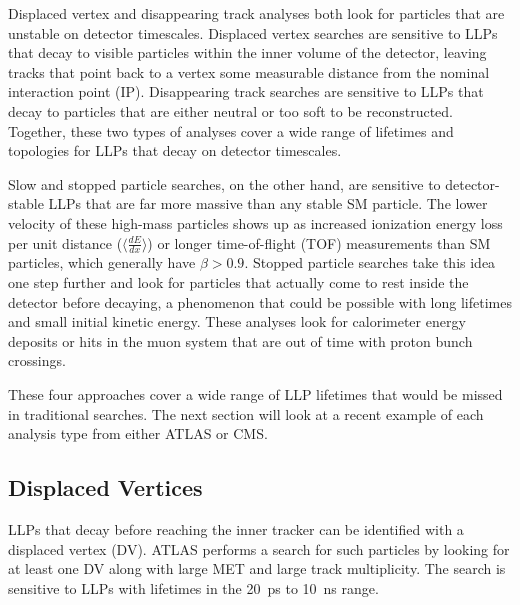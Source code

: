 \documentclass[12pt]{article}
\begin{document}
    Displaced vertex and disappearing track analyses both look for particles that are unstable on detector timescales. Displaced vertex searches are sensitive to LLPs that decay to visible particles within the inner volume  of the detector, leaving tracks that point back to a vertex some measurable distance from the nominal interaction point (IP). Disappearing track searches are sensitive to LLPs that decay to particles that are either neutral or too soft to be reconstructed. Together, these two types of analyses cover a wide range of lifetimes and topologies for LLPs that decay on detector timescales.

    Slow and stopped particle searches, on the other hand, are sensitive to detector-stable LLPs that are far more massive than any stable SM particle. The lower velocity of these high-mass particles shows up as increased ionization energy loss per unit distance ($\langle\frac{dE}{dx}\rangle$) or longer time-of-flight (TOF) measurements than SM particles, which generally have $\beta > \num{0.9}$. Stopped particle searches take this idea one step further and look for particles that actually come to rest inside the detector before decaying, a phenomenon that could be possible with long lifetimes and small initial kinetic energy. These analyses look for calorimeter energy deposits or hits in the muon system that are out of time with proton bunch crossings.

    These four approaches cover a wide range of LLP lifetimes that would be missed in traditional searches. The next section will look  at a recent example of each analysis type from either ATLAS or CMS.

\subsection{Displaced Vertices}
    LLPs that decay before reaching the inner tracker can be identified with a displaced vertex (DV). ATLAS performs a search for such particles by looking for at least one DV along with large MET and large track multiplicity. The search is sensitive to LLPs with lifetimes in the \SI{20}{\pico\s} to \SI{10}{\nano\s} range.
\end{document}
